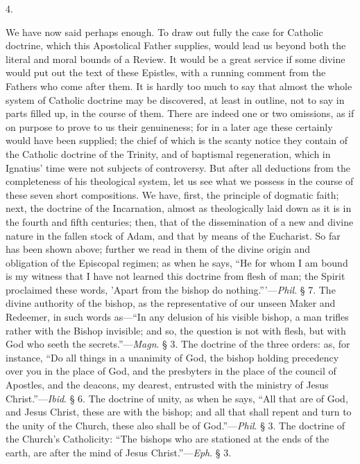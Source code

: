 4.

We have now said perhaps enough. To draw out
fully the case for Catholic doctrine, which this Apostolical Father supplies, would lead us beyond both the literal and moral
bounds of a Review. It would be a great service if some divine would
put out the text of these Epistles, with a running comment from the
Fathers who come after them. It is hardly too much to say that almost
the whole system of Catholic doctrine may be discovered, at least in
outline, not to say in parts filled up, in the course of them. There
are indeed one or two omissions, as if on purpose to prove to us their
genuineness; for in a later age these certainly would have been
supplied; the chief of which is the scanty notice they contain of the
Catholic doctrine of the Trinity, and of baptismal regeneration, which
in Ignatius' time were not subjects of controversy. But after all
deductions from the completeness of his theological system, let us see
what we possess in the course of these seven short compositions. We
have, first, the principle of dogmatic faith; next, the doctrine of
the Incarnation, almost as theologically laid down as it is in the
fourth and fifth centuries; then, that of the dissemination of a new
and divine nature in the fallen stock of Adam, and that by means of
the Eucharist. So far has been shown above; further we read in them of
the divine origin and obligation of the Episcopal regimen; as when he
says, ``He for whom I am bound is my witness that I have not learned
this doctrine from flesh of man; the Spirit proclaimed these words,
'Apart from the bishop do nothing.'''—\emph{Phil}. § 7. The divine
authority of the bishop, as the representative of our unseen Maker and
Redeemer, in such words as—``In any delusion of his visible bishop, a
man trifles rather with the Bishop invisible; and so, the question is
not with flesh, but with God who seeth the secrets.''—\emph{Magn}. §
3. The doctrine of the three orders: as, for instance, ``Do all things
in a unanimity of God, the bishop holding precedency over you in
the place of God, and the presbyters in the place of the council of
Apostles, and the deacons, my dearest, entrusted with the ministry of
Jesus Christ.''—\emph{Ibid}. § 6. The doctrine of unity, as when he
says, ``All that are of God, and Jesus Christ, these are with the
bishop; and all that shall repent and turn to the unity of the Church,
these also shall be of God.''—\emph{Phil}. § 3. The doctrine of the
Church's Catholicity: ``The bishops who are stationed at the ends of
the earth, are after the mind of Jesus Christ.''—\emph{Eph}. § 3.
